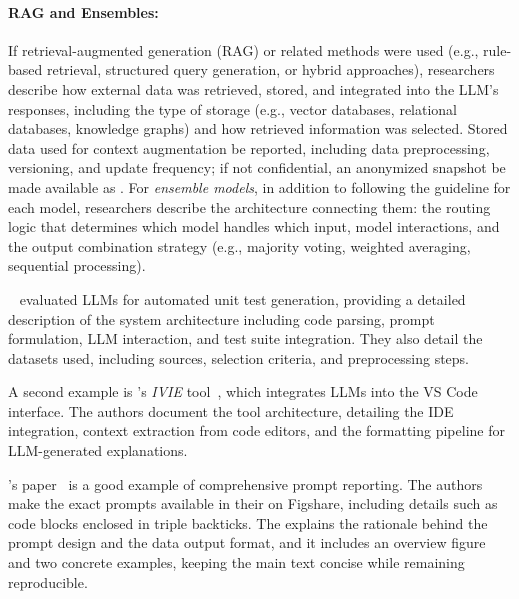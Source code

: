 \paragraph{RAG and Ensembles:}
If retrieval-augmented generation (RAG) or related methods were used (e.g., rule-based retrieval, structured query generation, or hybrid approaches), researchers \must describe how external data was retrieved, stored, and integrated into the LLM's responses, including the type of storage (e.g., vector databases, relational databases, knowledge graphs) and how retrieved information was selected.
Stored data used for context augmentation \should be reported, including data preprocessing, versioning, and update frequency; if not confidential, an anonymized snapshot \should be made available as \supplementarymaterial.
For \emph{ensemble models}, in addition to following the \modelversion guideline for each model, researchers \should describe the architecture connecting them: the routing logic that determines which model handles which input, model interactions, and the output combination strategy (e.g., majority voting, weighted averaging, sequential processing).


\citeauthor{DBLP:journals/tse/SchaferNET24}~\cite{DBLP:journals/tse/SchaferNET24} evaluated LLMs for automated unit test generation, providing a detailed description of the system architecture including code parsing, prompt formulation, LLM interaction, and test suite integration.
They also detail the datasets used, including sources, selection criteria, and preprocessing steps.

A second example is \citeauthor{DBLP:conf/chi/YanHWH24}'s \emph{IVIE} tool~\cite{DBLP:conf/chi/YanHWH24}, which integrates LLMs into the VS Code interface.
The authors document the tool architecture, detailing the IDE integration, context extraction from code editors, and the formatting pipeline for LLM-generated explanations.

\citeauthor{DBLP:journals/pacmse/LiangBBDFF024}'s paper~\cite{DBLP:journals/pacmse/LiangBBDFF024} is a good example of comprehensive prompt reporting.
The authors make the exact prompts available in their \supplementarymaterial on Figshare, including details such as code blocks enclosed in triple backticks.
The \paper explains the rationale behind the prompt design and the data output format, and it includes an overview figure and two concrete examples, keeping the main text concise while remaining reproducible.

